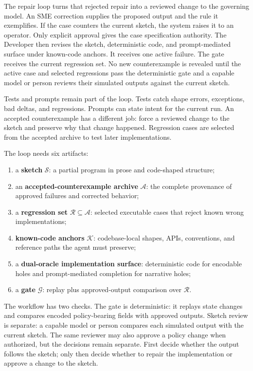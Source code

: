 \documentclass[11pt]{article}
\newcommand{\sketch}{\mathcal{S}}
\newcommand{\archive}{\mathcal{A}}
\newcommand{\regression}{\mathcal{R}}
\newcommand{\anchors}{\mathcal{K}}
\newcommand{\gate}{\mathcal{G}}
\begin{document}
The repair loop turns that rejected repair into a reviewed change to the governing model.  An
SME correction supplies the proposed output and the rule it exemplifies.  If the case counters
the current sketch, the system raises it to an operator.  Only explicit approval gives the case
specification authority.  The Developer then revises the sketch, deterministic code, and
prompt-mediated surface under known-code anchors.  It receives one active failure.  The gate
receives the current regression set.  No new counterexample is revealed until the active case
and selected regressions pass the deterministic gate and a capable model or person reviews their
simulated outputs against the current sketch.

Tests and prompts remain part of the loop.  Tests catch shape errors, exceptions, bad deltas, and
regressions.  Prompts can state intent for the current run.  An accepted counterexample has a
different job: force a reviewed change to the sketch and preserve why that change happened.
Regression cases are selected from the accepted archive to test later implementations.

The loop needs six artifacts:

\begin{enumerate}
  \item a \textbf{sketch} $\sketch$: a partial program in prose and code-shaped structure;
  \item an \textbf{accepted-counterexample archive} $\archive$: the complete provenance of
        approved failures and corrected behavior;
  \item a \textbf{regression set} $\regression \subseteq \archive$: selected executable cases
        that reject known wrong implementations;
  \item \textbf{known-code anchors} $\anchors$: codebase-local shapes, APIs, conventions, and
        reference paths the agent must preserve;
  \item a \textbf{dual-oracle implementation surface}: deterministic code for encodable holes
        and prompt-mediated completion for narrative holes;
  \item a \textbf{gate} $\gate$: replay plus approved-output comparison over $\regression$.
\end{enumerate}

The workflow has two checks.  The gate is deterministic: it replays state changes and compares
encoded policy-bearing fields with approved outputs.  Sketch review is separate: a capable model
or person compares each simulated output with the current sketch.  The same reviewer may also
approve a policy change when authorized, but the decisions remain separate.  First decide
whether the output follows the sketch; only then decide whether to repair the implementation or
approve a change to the sketch.
\end{document}
